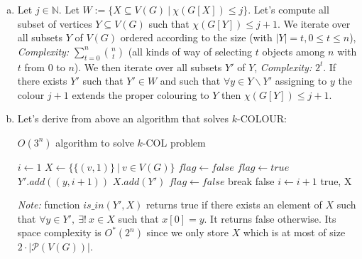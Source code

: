 \documentclass{article}
\begin{document}
\begin{enumerate}[(a)]
    \item Let $j \in \mathbb{N}$. Let $W:=\{X \subseteq V(G) \ | \ \chi(G[X]) \leq j\}$. Let's compute all subset of vertices $Y \subseteq V (G)$ such that $\chi(G[Y]) \leq j + 1$. We iterate over all subsets $Y$ of $V(G)$ ordered according to the size (with $|Y|=t, 0 \leq t \leq n$), \emph{Complexity:} $\sum\limits_{t=0}^{n}\binom{n}{t}$ (all kinds of way of selecting $t$ objects among $n$ with $t$ from $0$ to $n$). We then iterate over all subsets $Y'$ of $Y$, \emph{Complexity:} $2^t$. If there exists $Y'$ such that $Y' \in W$ and such that $\forall y\in Y\backslash Y'$ assigning to $y$ the colour $j+1$ extends the proper colouring to $Y$ then $\chi(G[Y]) \leq j+1$.
    \item Let's derive from above an algorithm that solves $k$-COLOUR:
    \begin{algorithm}[H]
        \caption{$O(3^n)$ algorithm to solve $k$-COL problem}    
        \begin{algorithmic}
            \State $i \gets 1$
            \State $X \gets \{\{(v, 1)\}\ |\ v\in V(G)\}$
                \State $flag \gets false$
                    \State $flag \gets true$
                \EndIf
                                \State $Y'.add((y, i+1))$
                            \EndFor
                                \State $X.add(Y')$
                                \State $flag \gets false$
                                \State break
                            \EndIf
                        \EndIf
                    \EndFor
                        \State \Return false
                    \EndIf
                \EndFor
                \State $i \gets i+1$
            \EndWhile
            \State \Return true, X
        \end{algorithmic}
    \end{algorithm}
    \emph{Note:} function $is\_in(Y', X)$ returns true if there exists an element of $X$ such that $\forall y\in Y',\ \exists !\ x\in X$ such that $x[0] = y$. It returns false otherwise.
    Its space complexity is $O^*(2^n)$ since we only store $X$ which is at most of size $2\cdot |\mathcal{P}(V(G))|$.
\end{enumerate}
\end{document}
